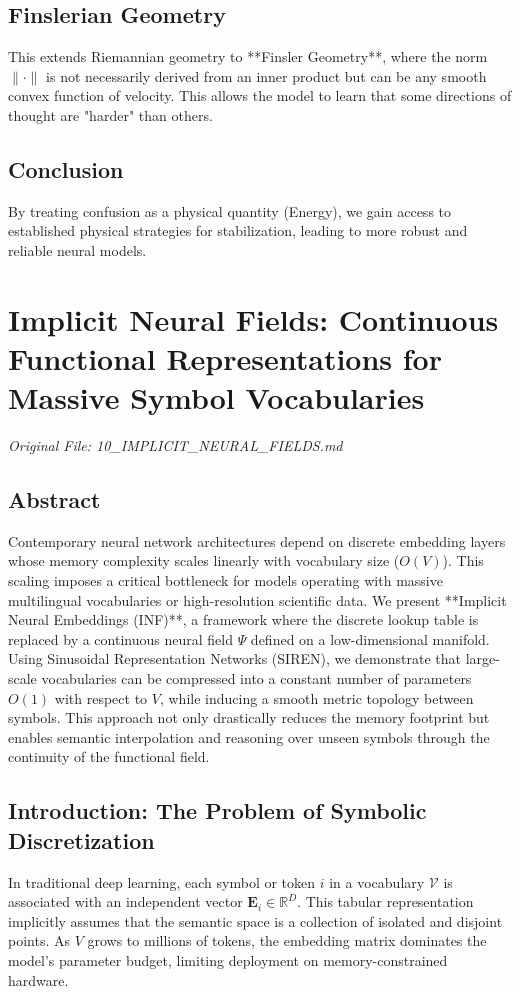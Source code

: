 \documentclass[11pt,a4paper]{report}
\begin{document}
\section{Finslerian Geometry}
This extends Riemannian geometry to **Finsler Geometry**, where the norm $\| \cdot \|$ is not necessarily derived from an inner product but can be any smooth convex function of velocity. This allows the model to learn that some directions of thought are "harder" than others.

\section{Conclusion}
By treating confusion as a physical quantity (Energy), we gain access to established physical strategies for stabilization, leading to more robust and reliable neural models.

\chapter{Implicit Neural Fields: Continuous Functional Representations for Massive Symbol Vocabularies}
\textit{Original File: 10\_IMPLICIT\_NEURAL\_FIELDS.md}

\section{Abstract}
Contemporary neural network architectures depend on discrete embedding layers whose memory complexity scales linearly with vocabulary size ($O(V)$). This scaling imposes a critical bottleneck for models operating with massive multilingual vocabularies or high-resolution scientific data. We present **Implicit Neural Embeddings (INF)**, a framework where the discrete lookup table is replaced by a continuous neural field $\Psi$ defined on a low-dimensional manifold. Using Sinusoidal Representation Networks (SIREN), we demonstrate that large-scale vocabularies can be compressed into a constant number of parameters $O(1)$ with respect to $V$, while inducing a smooth metric topology between symbols. This approach not only drastically reduces the memory footprint but enables semantic interpolation and reasoning over unseen symbols through the continuity of the functional field.

\section{Introduction: The Problem of Symbolic Discretization}
In traditional deep learning, each symbol or token $i$ in a vocabulary $\mathcal{V}$ is associated with an independent vector $\mathbf{E}_i \in \mathbb{R}^D$. This tabular representation implicitly assumes that the semantic space is a collection of isolated and disjoint points. As $V$ grows to millions of tokens, the embedding matrix dominates the model's parameter budget, limiting deployment on memory-constrained hardware.
\end{document}
